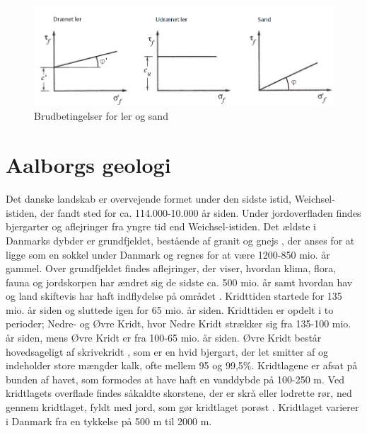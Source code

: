 \begin{figure}[htbp]
	\centering
	\includegraphics[width=1.0\textwidth]{billeder/friktionsvinkeller.png}
	\caption{Brudbetingelser for ler og sand \citep{geoteknik}}
	\label{fig:friktionsvinkler}
\end{figure}

\section{Aalborgs geologi}
Det danske landskab er overvejende formet under den sidste istid, Weichsel-istiden, der fandt sted for ca. 114.000-10.000 år siden. Under jordoverfladen findes bjergarter og aflejringer fra yngre tid end Weichsel-istiden. Det ældste i Danmarks dybder er grundfjeldet, bestående af granit og gnejs \citep{geopdf}, der anses for at ligge som en sokkel under Danmark og regnes for at være 1200-850 mio. år gammel. Over grundfjeldet findes aflejringer, der viser, hvordan klima, flora, fauna og jordskorpen har ændret sig de sidste ca. 500 mio. år samt hvordan hav og land skiftevis har haft indflydelse på området \citep{geolink}.
\newline
\newline
Kridttiden startede for 135 mio. år siden og sluttede igen for 65 mio. år siden. Kridttiden er opdelt i to perioder; Nedre- og Øvre Kridt, hvor Nedre Kridt strækker sig fra 135-100 mio. år siden, mens Øvre Kridt er fra 100-65 mio. år siden.  Øvre Kridt består hovedsageligt af skrivekridt \citep{geopdf}, som er en hvid bjergart, der let smitter af og indeholder store mængder kalk, ofte mellem 95 og 99,5\%. Kridtlagene er afsat på bunden af havet, som formodes at have haft en vanddybde på 100-250 m. Ved kridtlagets overflade findes såkaldte skorstene, der er skrå eller lodrette rør, ned gennem kridtlaget, fyldt med jord, som gør kridtlaget porøst \citep[ s. 15-16]{geobog}. Kridtlaget varierer i Danmark fra en tykkelse på 500 m til 2000 m.
\newline
\newline
